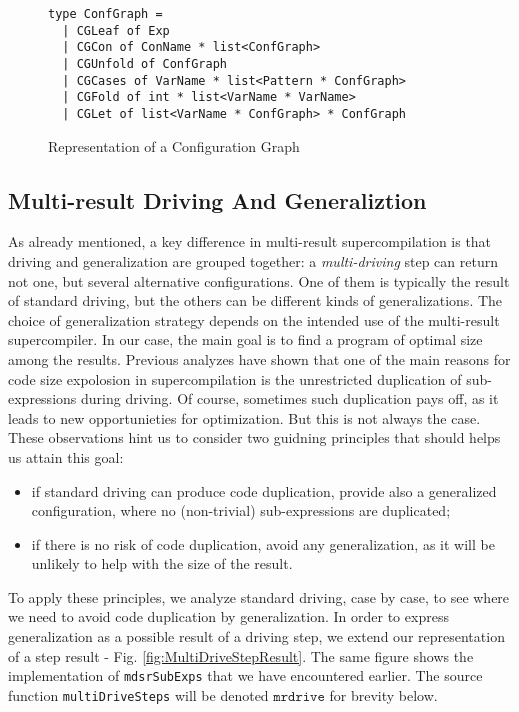 \documentclass[submission,copyright,creativecommons]{eptcs}
\begin{document}
\begin{figure}
\begin{lstlisting}
type ConfGraph =
  | CGLeaf of Exp
  | CGCon of ConName * list<ConfGraph>
  | CGUnfold of ConfGraph
  | CGCases of VarName * list<Pattern * ConfGraph>
  | CGFold of int * list<VarName * VarName>
  | CGLet of list<VarName * ConfGraph> * ConfGraph
\end{lstlisting}
\caption{Representation of a Configuration Graph}
\label{fig:ConfGraph}
\end{figure}

\subsection{Multi-result Driving And Generaliztion}

As already mentioned, a key difference in multi-result supercompilation is
that driving and generalization are grouped together: a \emph{multi-driving}
step can return not one, but several alternative configurations.
One of them is typically the result of standard driving, but the others
can be different kinds of generalizations.
The choice of generalization strategy depends on the intended use of the
multi-result supercompiler.
In our case, the main goal is to find a program of optimal size among the results.
Previous analyzes have shown that one of the main reasons for code size expolosion in
supercompilation is the unrestricted duplication of sub-expressions during driving.
Of course, sometimes such duplication pays off, as it leads to new opportunieties 
for optimization.
But this is not always the case.
These observations hint us to consider two guidning principles that should helps us attain this goal:
\begin{itemize}
  \item if standard driving can produce code duplication, provide also a generalized
    configuration, where no (non-trivial) sub-expressions are duplicated;
  \item if there is no risk of code duplication, avoid any generalization, as it will
    be unlikely to help with the size of the result.
\end{itemize}
To apply these principles, we analyze standard driving, case by case, to see where
we need to avoid code duplication by generalization.
In order to express generalization as a possible result of a driving step,
we extend our representation of a step result - Fig. \ref{fig:MultiDriveStepResult}.
The same figure shows the implementation of \verb|mdsrSubExps| that we have encountered earlier.
The source function \verb|multiDriveSteps| will be denoted $\mathtt{mrdrive}$ for brevity below.
\end{document}
